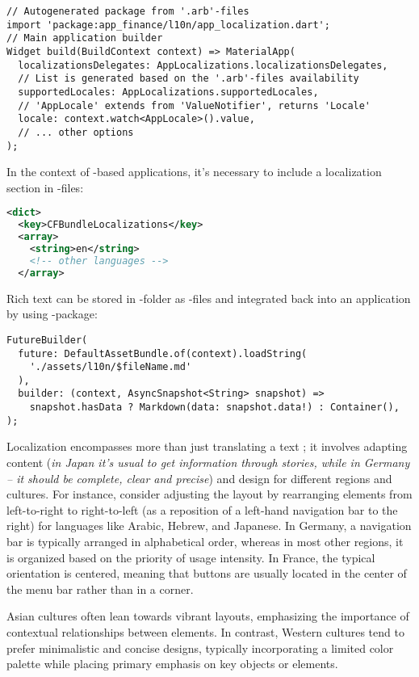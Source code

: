 \begin{lstlisting}
// Autogenerated package from '.arb'-files
import 'package:app_finance/l10n/app_localization.dart';
// Main application builder
Widget build(BuildContext context) => MaterialApp(
  localizationsDelegates: AppLocalizations.localizationsDelegates,
  // List is generated based on the '.arb'-files availability
  supportedLocales: AppLocalizations.supportedLocales,
  // 'AppLocale' extends from 'ValueNotifier', returns 'Locale'
  locale: context.watch<AppLocale>().value,
  // ... other options
);
\end{lstlisting}

\noindent In the context of -based applications, it's necessary to include a localization section in 
-files:

\begin{lstlisting}[language=xml]
<dict>
  <key>CFBundleLocalizations</key>
  <array>
    <string>en</string>
    <!-- other languages -->
  </array>
\end{lstlisting}

\noindent Rich text can be stored in -folder as -files and integrated back into an application by using 
-package:

\begin{lstlisting}
FutureBuilder(
  future: DefaultAssetBundle.of(context).loadString(
    './assets/l10n/$fileName.md'
  ),
  builder: (context, AsyncSnapshot<String> snapshot) =>
    snapshot.hasData ? Markdown(data: snapshot.data!) : Container(),
);
\end{lstlisting}

\noindent Localization encompasses more than just translating a text \cite{Hofs03}; it involves adapting content 
(\emph{in Japan it's usual to get information through stories, while in Germany -- it should be complete, clear and 
precise}) and design for different regions and cultures. For instance, consider adjusting the layout by rearranging 
elements from left-to-right to right-to-left (as a reposition of a left-hand navigation bar to the right) for languages 
like Arabic, Hebrew, and Japanese. In Germany, a navigation bar is typically arranged in alphabetical order, whereas 
in most other regions, it is organized based on the priority of usage intensity. In France, the typical orientation is 
centered, meaning that buttons are usually located in the center of the menu bar rather than in a corner.

Asian cultures often lean towards vibrant layouts, emphasizing the importance of contextual relationships between 
elements. In contrast, Western cultures tend to prefer minimalistic and concise designs, typically incorporating a 
limited color palette while placing primary emphasis on key objects or elements.

